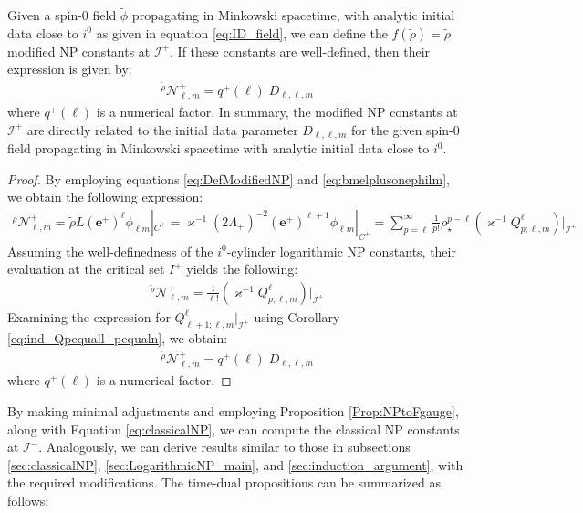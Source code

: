 \begin{proposition}
    Given a spin-0 field $\tilde{\phi}$ propagating in Minkowski spacetime, with analytic initial data close to $i^0$ as given in equation \eqref{eq:ID_field}, we can define the $f(\tilde{\rho})=\tilde{\rho}$ modified NP constants at $\mathscr{I}^+$. If these constants are well-defined, then their expression is given by:
    \begin{align}
      {}^{\tilde{\rho}}\mathcal{N}^{+}_{\ell,m}=q^{+}(\ell) \;D_{\ell,\ell,m}
    \end{align}
    where $q^{+}(\ell)$ is a numerical factor. In summary, the modified NP constants at $\mathscr{I}^{+}$ are directly related to the initial data parameter $D_{\ell,\ell,m}$ for the given spin-0 field propagating in Minkowski spacetime with analytic initial data close to $i^0$.
\end{proposition}

\begin{proof}             
    By employing equations \eqref{eq:DefModifiedNP} and \eqref{eq:bmelplusonephilm}, we obtain the following expression:
    \begin{align}
      {}^{\tilde{\rho}}\mathcal{N}^{+}_{\ell,m}= \tilde{\rho}L(\boldsymbol{e}^{+})^{\ell}\phi_{\ell m}|_{{C}^{+}}= \varkappa^{-1}(2\Lambda_+)^{-2}(\boldsymbol{e}^{+})^{\ell+1}\phi_{\ell m}|_{{C}^{+}} =\sum_{p=\ell}^{\infty}\frac{1}{p!}\rho_{\star}^{p-\ell}(\varkappa^{-1}Q^{\ell}_{p;\ell,m})|_{\mathscr{I}^{+}}
    \end{align}
    Assuming the well-definedness of the $i^0$-cylinder logarithmic NP constants, their evaluation at the critical set $I^{+}$ yields the following:
    \begin{align}
      {}^{\tilde{\rho}}\mathcal{N}^{+}_{\ell,m} =\frac{1}{\ell!} (\varkappa^{-1}Q^{\ell}_{p;\ell,m})|_{\mathscr{I}^{+}}
    \end{align}
    Examining the expression for $Q^{\ell}_{\ell+1;\ell,m}|_{\mathscr{I}^{+}}$ using Corollary \ref{eq:ind_Qpequall_pequaln}, we obtain:
    \begin{align}
      {}^{\tilde{\rho}}\mathcal{N}^{+}_{\ell,m}=q^{+}(\ell) \;D_{\ell,\ell,m}
    \end{align}
    where $q^{+}(\ell)$ is a numerical factor.
\end{proof}

By making minimal adjustments and employing Proposition \ref{Prop:NPtoFgauge}, along with Equation \eqref{eq:classicalNP}, we can compute the classical NP constants at $\mathscr{I}^{-}$. Analogously, we can derive results similar to those in subsections \ref{sec:classicalNP}, \ref{sec:LogarithmicNP_main}, and \ref{sec:induction_argument}, with the required modifications. The time-dual propositions can be summarized as follows:
    
